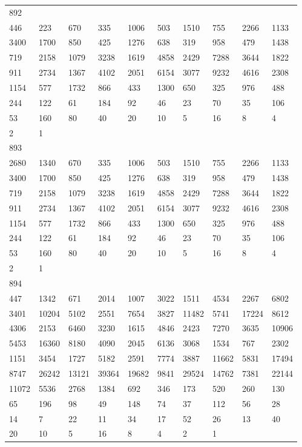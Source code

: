 \begin{longtable}{*{10}{l}}
892&&&&&&&&&\\
446& 223& 670& 335& 1006& 503& 1510& 755& 2266& 1133\\
3400& 1700& 850& 425& 1276& 638& 319& 958& 479& 1438\\
719& 2158& 1079& 3238& 1619& 4858& 2429& 7288& 3644& 1822\\
911& 2734& 1367& 4102& 2051& 6154& 3077& 9232& 4616& 2308\\
1154& 577& 1732& 866& 433& 1300& 650& 325& 976& 488\\
244& 122& 61& 184& 92& 46& 23& 70& 35& 106\\
53& 160& 80& 40& 20& 10& 5& 16& 8& 4\\
2& 1& \\

893&&&&&&&&&\\
2680& 1340& 670& 335& 1006& 503& 1510& 755& 2266& 1133\\
3400& 1700& 850& 425& 1276& 638& 319& 958& 479& 1438\\
719& 2158& 1079& 3238& 1619& 4858& 2429& 7288& 3644& 1822\\
911& 2734& 1367& 4102& 2051& 6154& 3077& 9232& 4616& 2308\\
1154& 577& 1732& 866& 433& 1300& 650& 325& 976& 488\\
244& 122& 61& 184& 92& 46& 23& 70& 35& 106\\
53& 160& 80& 40& 20& 10& 5& 16& 8& 4\\
2& 1& \\

894&&&&&&&&&\\
447& 1342& 671& 2014& 1007& 3022& 1511& 4534& 2267& 6802\\
3401& 10204& 5102& 2551& 7654& 3827& 11482& 5741& 17224& 8612\\
4306& 2153& 6460& 3230& 1615& 4846& 2423& 7270& 3635& 10906\\
5453& 16360& 8180& 4090& 2045& 6136& 3068& 1534& 767& 2302\\
1151& 3454& 1727& 5182& 2591& 7774& 3887& 11662& 5831& 17494\\
8747& 26242& 13121& 39364& 19682& 9841& 29524& 14762& 7381& 22144\\
11072& 5536& 2768& 1384& 692& 346& 173& 520& 260& 130\\
65& 196& 98& 49& 148& 74& 37& 112& 56& 28\\
14& 7& 22& 11& 34& 17& 52& 26& 13& 40\\
20& 10& 5& 16& 8& 4& 2& 1& \\


\end{longtable}
